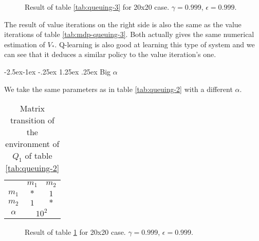 \documentclass[
  a4paper, xcolor = usenames,dvipsnames]{article}
\makeatletter
\renewcommand\paragraph{\@startsection{paragraph}{4}{\z@}%
  {-2.5ex\@plus -1ex \@minus -.25ex}%
  {1.25ex \@plus .25ex}%
  {\normalfont\normalsize\bfseries}}
\theoremstyle{definition}
\theoremstyle{definition}
\theoremstyle{definition}
\theoremstyle{definition}
\theoremstyle{remark}
\makeatother
\begin{document}
\begin{figure}

{\centering {}

}

\caption{Result of table \ref{tab:queuing-3} for 20x20 case. \(\gamma = 0.999\), \(\epsilon = 0.999\).}\label{fig:20x20-queuing-3}
\end{figure}

The result of value iterations on the right side is also the same as the value iterations of table \ref{tab:mdp-queuing-3}. Both actually gives the same numerical estimation of \(V_{*}\). Q-learning is also good at learning this type of system and we can see that it deduces a similar policy to the value iteration's one.

\hypertarget{big-alpha}{%
\paragraph{\texorpdfstring{Big \(\alpha\)}{Big \textbackslash alpha}}\label{big-alpha}}

We take the same parameters as in table \ref{tab:queuing-2} with a different \(\alpha\).

\begin{table}[!htbp]
\caption{Matrix transition of the environment of $Q_{1}$ of table \ref{tab:queuing-2}}
\begin{center}
\begin{tabular}{c c c}
    \hline
    & $m_{1}$ & $m_{2}$ \\
    $m_{1}$ & $*$ & $1$ \\
    $m_{2}$ & $1$ & $*$ \\
    \hline
    $\alpha$ & \multicolumn{2}{c}{$10^{2}$} \\
    \hline
\end{tabular}
\end{center}
\label{tab:queuing-4-mat-1}
\end{table}



\begin{figure}

{\centering {}

}

\caption{Result of table \ref{tab:queuing-4-mat-1} for 20x20 case. \(\gamma = 0.999\), \(\epsilon = 0.999\).}\label{fig:20x20-queuing-4}
\end{figure}
\end{document}
